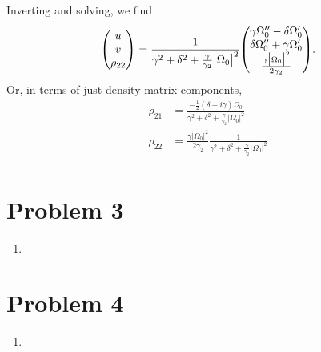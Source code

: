 \documentclass[12pt]{article}
\newcommand{\magsq}[1]{\big|#1\big|^2}
\begin{document}
Inverting and solving, we find
\[ \mqty(u\\v\\\rho_{22}) = \frac{1}{\gamma^2 + \delta^2 + \frac{\gamma}{\gamma_2}\magsq{\Omega_0}}\mqty(\gamma\Omega_0'' - \delta\Omega_0' \\ \delta\Omega_0'' + \gamma\Omega_0' \\ \frac{\gamma\magsq{\Omega_0}}{2\gamma_2}). \]
Or, in terms of just density matrix components,
\begin{align*}
    \tilde{\rho}_{21} &= \frac{-\frac{1}{2}(\delta+i\gamma)\Omega_0}{\gamma^2 + \delta^2 + \frac{\gamma}{\gamma_2}\magsq{\Omega_0}} \\
    \rho_{22} &= \frac{\gamma\magsq{\Omega_0}}{2\gamma_2}\frac{1}{\gamma^2 + \delta^2 + \frac{\gamma}{\gamma_2}\magsq{\Omega_0}} \\
\end{align*}

\section*{Problem 3}
\begin{enumerate}[label=(\alph*)]
    \item 
\end{enumerate}

\section*{Problem 4}
\begin{enumerate}[label=(\alph*)]
    \item 
\end{enumerate}


\end{document}
